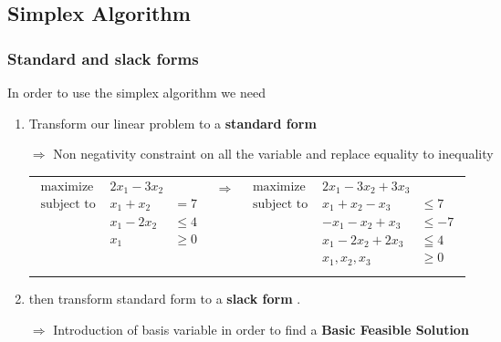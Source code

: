 \subsection{Simplex Algorithm}

\subsubsection{Standard and slack forms}
In order to use the simplex algorithm we need 
\begin{enumerate}
    \item Transform our linear problem  to  a \textbf{standard form}

        $\Rightarrow $ Non negativity constraint on all the
        variable and replace equality to inequality

        \begin{tabular}{m{7cm}cm{7cm}}
            \begin{eqnarray*}
                \textrm{maximize } & 2x_1 - 3x_2\\
                \textrm{subject to } & x_1 + x_2 &= 7\\
                                     & x_1 - 2x_2 &\leq 4 \\
                                     & x_1 &\geq 0\\
            \end{eqnarray*}
            & $\Rightarrow$ &
            \begin{eqnarray*}
                \textrm{maximize } & 2x_1 - 3x_2 + 3x_3\\
                \textrm{subject to } & x_1 + x_2 - x_3 & \leq 7\\
                                     & -x_1 - x_2 + x_3 & \leq -7  \\
                                     & x_1 - 2x_2 + 2x_3 & \leqq 4 \\
                                     & x_1, x_2, x_3 & \geq 0\\
            \end{eqnarray*}
        \end{tabular}

    \item then transform standard form to a \textbf{slack form }.

        $\Rightarrow$  Introduction of basis variable in order to find a 
        \textbf{Basic Feasible Solution}


\end{enumerate}
